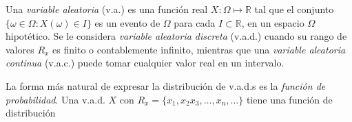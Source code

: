 Una \emph{variable aleatoria} (v.a.) es una función real $X: \Omega\mapsto\mathbb{R}$ tal que el conjunto $\{\omega\in\Omega:X(\omega)\in I\}$ es un evento de $\Omega$ para cada $I\subset\mathbb{R}$, en un espacio $\Omega$ hipotético. Se le considera \emph{variable aleatoria discreta} (v.a.d.) cuando su rango de valores $R_x$ es finito o contablemente infinito, mientras que una \emph{variable aleatoria continua} (v.a.c.) puede tomar cualquier valor real en un intervalo.



La forma más natural de expresar la distribución de v.a.d.s es la \emph{función de probabilidad}\cite{blitz19}. Una v.a.d. $X$ con $R_x=\{x_1,x_2x_3,\ldots,x_n,\ldots\}$ tiene una función de distribución
\begin{equation}

\end{equation}

